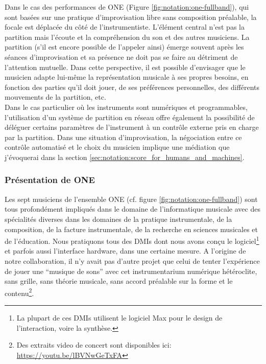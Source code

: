 \noindent Dans le cas des performances de ONE (Figure \ref{fig:notation:one-fullband}), qui sont basées sur une pratique d'improvisation libre sans composition préalable, la focale est déplacée du côté de l'instrumentiste. L'élément central n'est pas la partition mais l'écoute et la compréhension du son et des autres musiciens. La partition (s'il est encore possible de l'appeler ainsi) émerge souvent après les séances d'improvisation et sa présence ne doit pas se faire au détriment de l'attention mutuelle. Dans cette perspective, il est possible d'envisager que le musicien adapte lui-même la représentation musicale à ses propres besoins, en fonction des parties qu'il doit jouer, de ses préférences personnelles, des différents mouvements de la partition, etc.\\
\indent Dans le cas particulier où les instruments sont numériques et programmables, l'utilisation d'un système de partition en réseau offre également la possibilité de déléguer certains paramètres de l'instrument à un contrôle externe pris en charge par la partition. Dans une situation d'improvisation, la négociation entre ce contrôle automatisé et le choix du musicien implique une médiation que j'évoquerai dans la section \ref{sec:notation:score_for_humans_and_machines}.

\subsubsection{Présentation de ONE}

\noindent Les sept musiciens de l'ensemble ONE (cf. figure \ref{fig:notation:one-fullband}) sont tous profondément impliqués dans le domaine de l'informatique musicale avec des spécialités diverses dans les domaines de la pratique instrumentale, de la composition, de la facture instrumentale, de la recherche en sciences musicales et de l'éducation. Nous pratiquons tous des \glspl{DMI} dont nous avons conçu le logiciel\footnote{La plupart de ces \glspl{DMI} utilisent le logiciel Max pour le design de l'interaction, voire la synthèse.} et parfois aussi l'interface hardware, dans une certaine mesure.
A l'origine de notre collaboration, il n'y avait pas d'autre projet que celui de tenter l'expérience de jouer une ``musique de sons'' avec cet instrumentarium numérique hétéroclite, sans grille, sans théorie musicale, sans accord préalable sur la forme et le contenu\footnote{Des extraits video de concert sont disponibles ici: \url{https://youtu.be/lBVNwGeTxFA}}.\\

